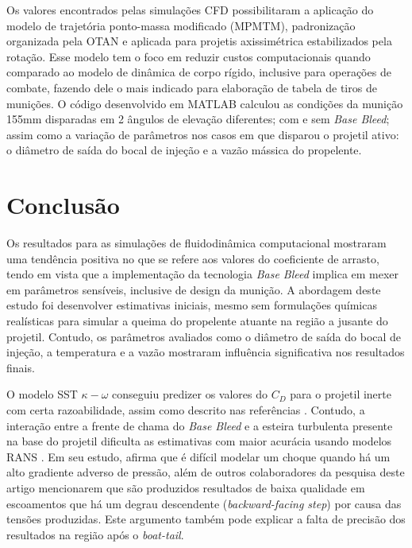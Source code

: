 Os valores encontrados pelas simulações CFD possibilitaram a aplicação do modelo de trajetória ponto-massa modificado (MPMTM), padronização organizada pela OTAN \cite{stanag4355} e aplicada para projetis axissimétrica estabilizados pela rotação. Esse modelo tem o foco em reduzir custos computacionais quando comparado ao modelo de dinâmica de corpo rígido, inclusive para operações de combate, fazendo dele o mais indicado para elaboração de tabela de tiros de munições. O código desenvolvido em MATLAB\textregistered{} \cite{ThallyoENCIT2022,Thallyo2022} calculou as condições da munição 155mm disparadas em 2 ângulos de elevação diferentes; com e sem \textit{Base Bleed}; assim como a variação de parâmetros nos casos em que disparou o projetil ativo: o diâmetro de saída do bocal de injeção e a vazão mássica do propelente. 

\section{Conclusão}

Os resultados para as simulações de fluidodinâmica computacional mostraram uma tendência positiva no que se refere aos valores do coeficiente de arrasto, tendo em vista que a implementação da tecnologia \textit{Base Bleed} implica em mexer em parâmetros sensíveis, inclusive de design da munição. A abordagem deste estudo foi desenvolver estimativas iniciais, mesmo sem formulações químicas realísticas para simular a queima do propelente atuante na região a jusante do projetil. Contudo, os parâmetros avaliados como o diâmetro de saída do bocal de injeção, a temperatura e a vazão mostraram influência significativa nos resultados finais.

O modelo SST $\kappa-\omega$ conseguiu predizer os valores do $C_D$ para o projetil inerte com certa razoabilidade, assim como descrito nas referências \cite{Mahmoud2009,nicolas-perez_accuracy_2017}. Contudo, a interação entre a frente de chama do \textit{Base Bleed} e a esteira turbulenta presente na base do projetil dificulta as estimativas com maior acurácia usando modelos RANS \cite{nicolas-perez_accuracy_2017}. Em seu estudo, \citeauthor{Spalart1992} afirma que é difícil modelar um choque quando há um alto gradiente adverso de pressão, além de outros colaboradores da pesquisa deste artigo mencionarem que são produzidos resultados de baixa qualidade em escoamentos que há um degrau descendente (\textit{backward-facing step}) por causa das tensões produzidas. Este argumento também pode explicar a falta de precisão dos resultados na região após o \textit{boat-tail}.

